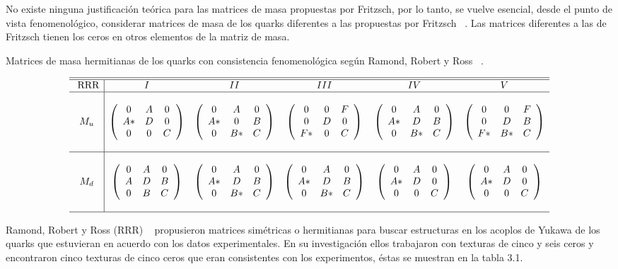 No existe ninguna justificaci\'on te\'orica para las matrices de masa  
propuestas por Fritzsch, por lo tanto, se vuelve esencial, desde el punto de 
vista fenomenol\'ogico, considerar matrices de masa de los quarks diferentes a 
las propuestas por Fritzsch ~\cite{Mah200901}. Las matrices diferentes a las de 
Fritzsch tienen los ceros en otros elementos de la matriz de masa. 
{\tiny
\begin{table}[h!]\label{t2}
\begin{scriptsize}
\caption{Matrices de { masa} hermitianas de los quarks con consistencia 
fenomenol\'ogica seg\'un Ramond, Robert y Ross ~\cite{rrr}.}
$$\ba{c|ccccc}\hline\hline
\mbox{ RRR} & I & II & III & IV & V\\ \hline \\
M_u&\left(\ba{ccc} 0&A&0\\ A*&D&0\\ 0&0&C \ea\right) & 
\left(\ba{ccc} 0&A&0\\ A*&0&B\\ 0&B*&C \ea\right) & 
\left(\ba{ccc} 0&0&F\\ 0&D&0\\ F*&0&C \ea\right) & 
\left(\ba{ccc} 0&A&0\\ A*&D&B\\ 0&B*&C \ea\right) & 
\left(\ba{ccc} 0&0&F\\ 0&D&B\\ F*&B*&C \ea\right)\\  \\ \hline\\
M_d&\left(\ba{ccc} 0&A&0\\ A&D&B\\ 0&B&C \ea\right) & 
\left(\ba{ccc} 0&A&0\\ A*&D&B\\ 0&B*&C \ea\right) & 
\left(\ba{ccc} 0&A&0\\ A*&D&B\\ 0&B*&C \ea\right) & 
\left(\ba{ccc} 0&A&0\\ A*&D&0\\ 0&0&C \ea\right) & 
\left(\ba{ccc} 0&A&0\\ A*&D&0\\ 0&0&C \ea\right)\\  \\ \hline
\ea $$
\end{scriptsize}
\end{table}
}
Ramond, Robert y Ross (RRR) ~\cite{rrr} propusieron matrices sim\'etricas o 
hermitianas para buscar estructuras en los acoplos de Yukawa de los quarks que 
estuvieran en acuerdo con los datos experimentales. En su investigaci\'on ellos
trabajaron con texturas de cinco y seis ceros y encontraron cinco texturas de
cinco ceros que eran consistentes con los experimentos, \'estas se muestran en
la tabla 3.1.

